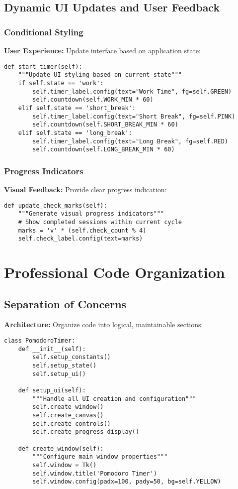 \documentclass[12pt,a4paper]{article}
\begin{document}
\subsection{Dynamic UI Updates and User Feedback}

\subsubsection{Conditional Styling}
\textbf{User Experience:} Update interface based on application state:

\begin{lstlisting}
def start_timer(self):
    """Update UI styling based on current state"""
    if self.state == 'work':
        self.timer_label.config(text="Work Time", fg=self.GREEN)
        self.countdown(self.WORK_MIN * 60)
    elif self.state == 'short_break':
        self.timer_label.config(text="Short Break", fg=self.PINK)
        self.countdown(self.SHORT_BREAK_MIN * 60)
    elif self.state == 'long_break':
        self.timer_label.config(text="Long Break", fg=self.RED)
        self.countdown(self.LONG_BREAK_MIN * 60)
\end{lstlisting}

\subsubsection{Progress Indicators}
\textbf{Visual Feedback:} Provide clear progress indication:

\begin{lstlisting}
def update_check_marks(self):
    """Generate visual progress indicators"""
    # Show completed sessions within current cycle
    marks = 'v' * (self.check_count % 4)
    self.check_label.config(text=marks)
\end{lstlisting}

\section{Professional Code Organization}

\subsection{Separation of Concerns}
\textbf{Architecture:} Organize code into logical, maintainable sections:

\begin{lstlisting}
class PomodoroTimer:
    def __init__(self):
        self.setup_constants()
        self.setup_state()
        self.setup_ui()
    
    def setup_ui(self):
        """Handle all UI creation and configuration"""
        self.create_window()
        self.create_canvas()
        self.create_controls()
        self.create_progress_display()
    
    def create_window(self):
        """Configure main window properties"""
        self.window = Tk()
        self.window.title('Pomodoro Timer')
        self.window.config(padx=100, pady=50, bg=self.YELLOW)
\end{lstlisting}
\end{document}
